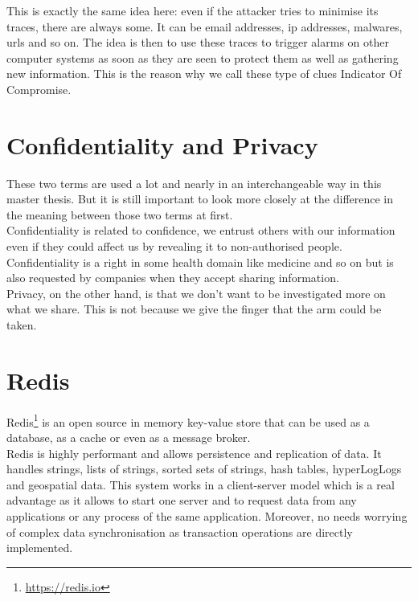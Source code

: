 \documentclass{eplmastersthesis}
\begin{document}
This is exactly the same idea here: even if the attacker tries to minimise its traces, there are always some. It can be email addresses, \gls{ip} addresses, malwares, \glspl{url} and so on.
The idea is then to use these traces to trigger alarms on other computer systems as soon as they are seen to protect them as well as gathering new information. This is the reason why we call these type of clues Indicator Of Compromise.

\section{Confidentiality and Privacy}
These two terms are used a lot and nearly in an interchangeable way in this master thesis. But it is still important to look more closely at the difference in the meaning between those two terms at first.\\

Confidentiality is related to confidence, we entrust others with our information even if they could affect us by revealing it to non-authorised people. Confidentiality is a right in some health domain like medicine and so on but is also requested by companies when they accept sharing information.\\

Privacy, on the other hand, is that we don't want to be investigated more on what we share. This is not because we give the finger that the arm could be taken.

\section{Redis}
Redis\footnote{\url{https://redis.io}} is an open source in memory key-value store that can be used as a database, as a cache or even as a message broker.\\

Redis is highly performant and allows persistence and replication of data. It handles strings, lists of strings, sorted sets of strings, hash tables, hyperLogLogs and geospatial data. This system works in a client-server model which is a real advantage as it allows to start one server and to request data from any applications or any process of the same application. Moreover, no needs worrying of complex data synchronisation as transaction operations are directly implemented.
\end{document}
